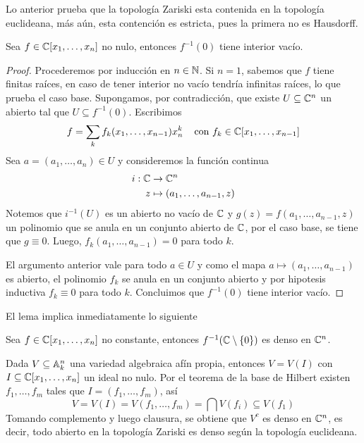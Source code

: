 \documentclass[11pt]{article}
\begin{document}
\noindent Lo anterior prueba que la topología Zariski esta contenida en la topología euclideana,
más aún, esta contención es estricta, pues la primera no es Hausdorff.

\begin{lema}
    Sea $f\in\mathbb{C}[x_{1},\dots,x_{n}]$ no nulo, entonces $f^{-1}(0)$ tiene interior vacío.
\end{lema}

\begin{proof}
    Procederemos por inducción en $n\in\mathbb{N}$. Si $n=1$, sabemos que $f$ tiene finitas raíces, en 
    caso de tener interior no vacío tendría infinitas raíces, lo que prueba el caso base. 
    Supongamos, por contradicción, que existe $U\subseteq\mathbb{C}^{n}$ un abierto tal que 
    $U\subseteq f^{-1}(0)$. Escribimos
    \begin{equation*}
        f=\sum_{k}f_{k}(x_{1},\dots,x_{n-1})x_{n}^{k}
        \hspace{4mm}\text{con } f_{k}\in\mathbb{C}[x_{1},\dots,x_{n-1}]
    \end{equation*}
    Sea $a=(a_{1},\dots,a_{n})\in U$ y consideremos la función continua
    \begin{align*}
        i:\mathbb{C} &\to \mathbb{C}^{n} \\
        z & \mapsto (a_{1},\dots,a_{n-1},z)
    \end{align*}
    Notemos que $i^{-1}(U)$ es un abierto no vacío de $\mathbb{C}$ y $g(z)=f(a_{1},\dots,a_{n-1},z)$ un 
    polinomio que se anula en un conjunto abierto de $\mathbb{C}$, por el caso base, se tiene que 
    $g\equiv0$. Luego, $f_{k}(a_{1},\dots,a_{n-1})=0$ para todo $k$.

    \vspace{1mm}
    El argumento anterior vale para todo $a\in U$ y como el mapa $a\mapsto(a_{1},\dots,a_{n-1})$ 
    es abierto, el polinomio $f_{k}$ se anula en un conjunto abierto y por hipotesis inductiva 
    $f_{k}\equiv0$ para todo $k$. Concluimos que $f^{-1}(0)$ tiene interior vacío.
\end{proof}

\noindent El lema implica inmediatamente lo siguiente

\begin{cor}
    Sea $f\in\mathbb{C}[x_{1},\dots,x_{n}]$ no constante, entonces $f^{-1}(\mathbb{C}\setminus\{0\})$ es denso en 
    $\mathbb{C}^{n}$.
\end{cor}

\noindent Dada $V\subseteq\mathbb{A}_{k}^{n}$ una variedad algebraica afín propia, entonces $V=V(I)$ con 
$I\subseteq\mathbb{C}[x_{1},\dots,x_{n}]$ un ideal no nulo. Por el teorema de la base de Hilbert existen 
$f_{1},\dots,f_{m}$ tales que $I=(f_{1},\dots,f_{m})$, así 
\begin{equation*}
    V=V(I)=V(f_{1},\dots,f_{m})=\bigcap V(f_{i})\subseteq V(f_{1})
\end{equation*}
Tomando complemento y luego clausura, se obtiene que $V^{c}$ es denso en $\mathbb{C}^{n}$, es decir, todo 
abierto en la topología Zariski es denso según la topología euclideana.
\end{document}
